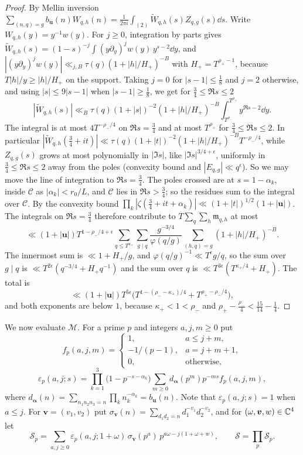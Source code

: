 \documentclass[11pt,colorlinks]{charlie}
\begin{document}
\begin{proof}
By Mellin inversion $\sum_{(n,q)=g}b_{\boldsymbol u}(n)W_{q,h}(n)=\frac1{2\pi i}\int_{(2)}\widetilde W_{q,h}(s)Z_{q,g}(s)\dd s$. Write $W_{q,h}(y)=y^{-1}w(y)$. For $j\ge0$, integration by parts gives $\widetilde W_{q,h}(s)=(1-s)^{-j}\int(y\partial_y)^jw(y)\,y^{s-2}\dd y$, and $|(y\partial_y)^jw(y)|\ll_{j,B}\tau(q)(1+|h|/H_+)^{-B}$ with $H_+=T^{\rho_+-1}$, because $T|h|/y\ge|h|/H_+$ on the support. Taking $j=0$ for $|s-1|\le\frac18$ and $j=2$ otherwise, and using $|s|\le9|s-1|$ when $|s-1|\ge\frac18$, we get for $\frac34\le\Re s\le2$
\begin{equation}\label{eq:Wtildebound}
 |\widetilde W_{q,h}(s)|\ll_B\tau(q)(1+|s|)^{-2}(1+|h|/H_+)^{-B}\int_{T^{\rho_-}}^{T^{\rho_+}}y^{\Re s-2}\dd y .
\end{equation}
The integral is at most $4T^{-\rho_-/4}$ on $\Re s=\frac34$ and at most $T^{\rho_+}$ for $\frac34\le\Re s\le2$. In particular $|\widetilde W_{q,h}(\frac34+it)|\ll\tau(q)(1+|t|)^{-2}(1+|h|/H_+)^{-B}T^{-\rho_-/4}$, while $Z_{q,g}(s)$ grows at most polynomially in $|\Im s|$, like $|\Im s|^{3/4+\epsilon}$, uniformly in $\frac34\le\Re s\le2$ away from the poles (convexity bound and $|E_{q,g}|\ll q^\epsilon$). So we may move the line of integration to $\Re s=\frac34$. The poles crossed are at $s=1-\alpha_k$, inside $\mathcal C$ as $|\alpha_k|<r_0/L$, and $\mathcal C$ lies in $\Re s>\frac34$; so the residues sum to the integral over $\mathcal C$. By the convexity bound $\prod_k|\zeta(\frac34+it+\alpha_k)|\ll(1+|t|)^{1/2}(1+|\boldsymbol u|)$. The integrals on $\Re s=\frac34$ therefore contribute to $T\sum_q\sum_h\mathfrak m_{q,h}$ at most
\[
 \ll(1+|\boldsymbol u|)T^{1-\rho_-/4+\epsilon}\sum_{q\le T^{\kappa_+}}\sum_{g\mid q}\frac{g^{-3/4}}{\varphi(q/g)}\sum_{(h,q)=g}(1+|h|/H_+)^{-B}.
\]
The innermost sum is $\ll1+H_+/g$, and $\varphi(q/g)^{-1}\ll T^\epsilon g/q$, so the sum over $g\mid q$ is $\ll T^{2\epsilon}(q^{-3/4}+H_+q^{-1})$ and the sum over $q$ is $\ll T^{3\epsilon}(T^{\kappa_+/4}+H_+)$. The total is
\[
 \ll(1+|\boldsymbol u|)T^{5\epsilon}\big(T^{1-(\rho_--\kappa_+)/4}+T^{\rho_+-\rho_-/4}\big),
\]
and both exponents are below $1$, because $\kappa_+<1<\rho_-$ and $\rho_+-\frac{\rho_-}4<\frac{15}{14}-\frac14$.
\end{proof}

We now evaluate $\mathcal M$. For a prime $p$ and integers $a,j,m\ge0$ put
\[
 f_p(a,j,m)=\begin{cases}1,&a\le j+m,\\-1/(p-1),&a=j+m+1,\\0,&\text{otherwise},\end{cases}
\]
\[
 \varepsilon_p(a,j;s)=\prod_{k=1}^3\big(1-p^{-s-\alpha_k}\big)\sum_{m\ge0}d_{\boldsymbol\alpha}(p^m)p^{-ms}f_p(a,j,m),
\]
where $d_{\boldsymbol\alpha}(n)=\sum_{n_1n_2n_3=n}\prod_kn_k^{-\alpha_k}=b_{\boldsymbol u}(n)$. Note that $\varepsilon_p(a,j;s)=1$ when $a\le j$. For $\boldsymbol v=(v_1,v_2)$ put $\sigma_{\boldsymbol v}(n)=\sum_{d_1d_2=n}d_1^{-v_1}d_2^{-v_2}$, and for $(\omega,\boldsymbol v,w)\in\mathbb{C}^4$ let
\[
 \mathcal S_p=\sum_{a,j\ge0}\varepsilon_p(a,j;1+\omega)\,\sigma_{\boldsymbol v}(p^a)\,p^{a\omega-j(1+\omega+w)},\qquad\mathcal S=\prod_p\mathcal S_p .
\]
\end{document}
